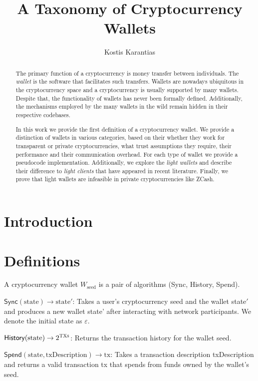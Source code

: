 \documentclass[sigconf]{acmart}
\begin{document}
\title{A Taxonomy of Cryptocurrency Wallets}

\author{Kostis Karantias}

\renewcommand{\shortauthors}{Karantias}

\begin{abstract}
    The primary function of a cryptocurrency is money transfer between individuals. The \emph{wallet} is the software that facilitates such transfers. Wallets are nowadays ubiquitous in the cryptocurrency space and a cryptocurrency is usually supported by many wallets. Despite that, the functionality of wallets has never been formally defined. Additionally, the mechanisms employed by the many wallets in the wild remain hidden in their respective codebases.
    
    In this work we provide the first definition of a cryptocurrency wallet. We provide a distinction of wallets in various categories, based on their whether they work for transparent or private cryptocurrencies, what trust assumptions they require, their performance and their communication overhead. For each type of wallet we provide a pseudocode implementation. Additionally, we explore the \emph{light wallets} and describe their difference to \emph{light clients} that have appeared in recent literature. Finally, we prove that light wallets are infeasible in private cryptocurrencies like ZCash.
\end{abstract}

\maketitle

\section{Introduction}

\section{Definitions}
\begin{definition}
    A cryptocurrency wallet $W_\text{seed}$ is a pair of algorithms (\textsf{Sync}, \textsf{History}, \textsf{Spend}).
    
    $\mathsf{Sync}(\text{state}) \rightarrow \text{state}'$: Takes a user's cryptocurrency seed and the wallet state$'$ and produces a new wallet state' after interacting with network participants. We denote the initial state as $\varepsilon$.
    
    $\mathsf{History}(\text{state}) \rightarrow 2^\textsc{TXs}$: Returns the transaction history for the wallet seed.
    
    $\mathsf{Spend}(\text{state}, \text{txDescription}) \rightarrow \text{tx}$: Takes a transaction description txDescription and returns a valid transaction tx that spends from funds owned by the wallet's seed.
\end{definition}
\end{document}
